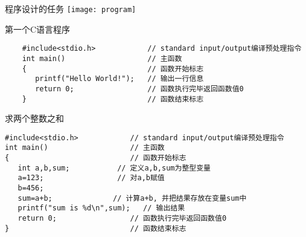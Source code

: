 \begin{frame}{程序设计的任务}
\texttt{[image: program]}
\end{frame}

\begin{frame}[fragile]{第一个C语言程序}
    \begin{lstlisting}
    #include<stdio.h>            // standard input/output编译预处理指令
    int main()                   // 主函数
    {                            // 函数开始标志
       printf("Hello World!");   // 输出一行信息
       return 0;                 // 函数执行完毕返回函数值0
    }                            // 函数结束标志
    \end{lstlisting}
\end{frame}

\begin{frame}[fragile]{求两个整数之和}
\begin{lstlisting}
#include<stdio.h>            // standard input/output编译预处理指令
int main()                   // 主函数
{                            // 函数开始标志
   int a,b,sum;           // 定义a,b,sum为整型变量
   a=123;                 // 对a,b赋值
   b=456;
   sum=a+b;              // 计算a+b, 并把结果存放在变量sum中
   printf("sum is %d\n",sum);   // 输出结果
   return 0;                 // 函数执行完毕返回函数值0
}                            // 函数结束标志
\end{lstlisting}
\end{frame}

